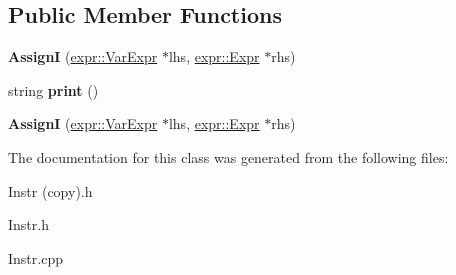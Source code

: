 \subsection*{Public Member Functions}
\begin{DoxyCompactItemize}
\item 
\mbox{\label{classspan_1_1ir_1_1instr_1_1AssignI_aa0a0a43086c10e50d1da869cbe4dfe02}} 
{\bfseries AssignI} (\hyperlink{classspan_1_1ir_1_1expr_1_1VarExpr}{expr\+::\+Var\+Expr} $\ast$lhs, \hyperlink{classspan_1_1ir_1_1expr_1_1Expr}{expr\+::\+Expr} $\ast$rhs)
\item 
\mbox{\label{classspan_1_1ir_1_1instr_1_1AssignI_a5c1966b81e7434d6072c104e9ee48a6f}} 
string {\bfseries print} ()
\item 
\mbox{\label{classspan_1_1ir_1_1instr_1_1AssignI_a91beb93bf20b53df96ce4872e255d541}} 
{\bfseries AssignI} (\hyperlink{classspan_1_1ir_1_1expr_1_1VarExpr}{expr\+::\+Var\+Expr} $\ast$lhs, \hyperlink{classspan_1_1ir_1_1expr_1_1Expr}{expr\+::\+Expr} $\ast$rhs)
\end{DoxyCompactItemize}


The documentation for this class was generated from the following files\+:\begin{DoxyCompactItemize}
\item 
Instr (copy).\+h\item 
Instr.\+h\item 
Instr.\+cpp\end{DoxyCompactItemize}
